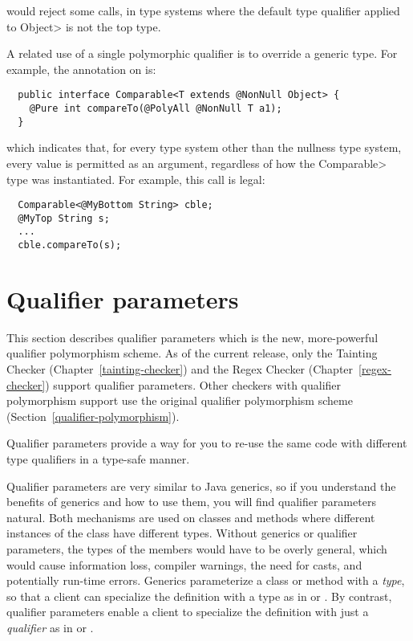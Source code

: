 \noindent
would reject some calls, in type systems where the default type qualifier
applied to \<Object> is not the top type.

A related use of a single polymorphic qualifier is to override a generic
type.  For example, the annotation on
is:

\begin{Verbatim}
  public interface Comparable<T extends @NonNull Object> {
    @Pure int compareTo(@PolyAll @NonNull T a1);
  }
\end{Verbatim}

\noindent
which indicates that, for every type system other than the nullness type
system, every value is permitted as an argument, regardless of how the
\<Comparable> type was instantiated.  For example, this call is legal:

\begin{Verbatim}
  Comparable<@MyBottom String> cble;
  @MyTop String s;
  ...
  cble.compareTo(s);
\end{Verbatim}


\section{Qualifier parameters\label{qualifier-parameters}}

This section describes qualifier parameters which is the new, more-powerful
qualifier polymorphism scheme.
As of the current release,
only the
Tainting Checker (Chapter~\ref{tainting-checker}) and the Regex Checker
(Chapter~\ref{regex-checker}) support qualifier parameters.
Other checkers with
qualifier polymorphism support use the original qualifier polymorphism scheme
(Section~\ref{qualifier-polymorphism}).

Qualifier parameters provide a way for you to re-use the same code with
different type qualifiers in a type-safe manner.

Qualifier parameters are very similar to Java generics, so if you understand the
benefits of generics and how to use them, you will find qualifier
parameters natural.  Both mechanisms are
used on classes and methods where different instances of the class have different
types.  Without generics or qualifier parameters, the types of the members would have
to be overly general, which would cause information loss, compiler
warnings, the need for casts, and potentially run-time errors.
Generics parameterize a class or method with
a \emph{type}, so that a client can specialize the definition with a type
as in  or .  By contrast, qualifier parameters
enable a client to specialize the definition with just a \emph{qualifier}
as in
 or .



